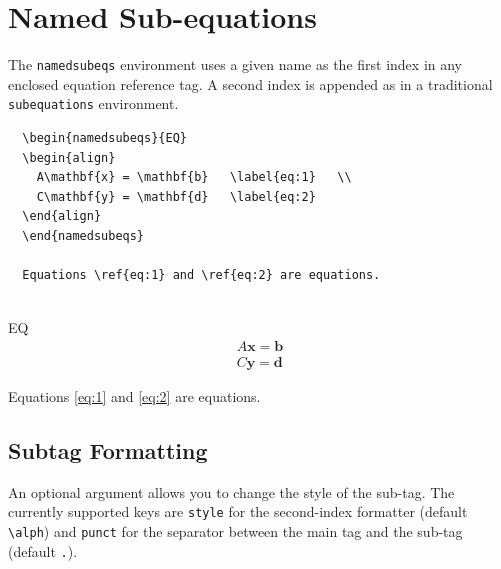 \documentclass{article}
\begin{document}
\section{Named Sub-equations}
The \verb|namedsubeqs| environment uses a given name as the first index in any enclosed equation reference tag. A second index is appended as in a traditional \verb|subequations| environment.

\begin{tcolorbox}
  \begin{Verbatim}
  \begin{namedsubeqs}{EQ}
  \begin{align}
    A\mathbf{x} = \mathbf{b}   \label{eq:1}   \\
    C\mathbf{y} = \mathbf{d}   \label{eq:2}
  \end{align}
  \end{namedsubeqs}
  
  Equations \ref{eq:1} and \ref{eq:2} are equations.
  
  \end{Verbatim}
\tcblower
    \begin{namedsubeqs}{EQ}
    \begin{align}
      A\mathbf{x} = \mathbf{b}   \label{eq:1}   \\
      C\mathbf{y} = \mathbf{d}   \label{eq:2}
    \end{align}
    \end{namedsubeqs}
    Equations \ref{eq:1} and \ref{eq:2} are equations.
\end{tcolorbox}


\subsection*{Subtag Formatting}
An optional argument allows you to change the style of the sub-tag. The currently supported keys are \verb|style| for the second-index formatter (default \verb|\alph|) and \verb|punct| for the separator between the main tag and the sub-tag (default \verb|.|).
\end{document}

